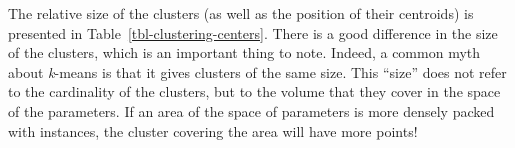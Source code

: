 \documentclass[
  letterpaper,
]{scrbook}
\begin{document}
{
\makeatletter
\def\LT@makecaption#1#2#3{%
  \noalign{\smash{\hbox{\kern\textwidth\rlap{\kern\marginparsep
  \parbox[t]{\marginparwidth}{%
    \footnotesize{%
      \vspace{(1.1\baselineskip)}
    #1{#2: }\ignorespaces #3}}}}}}%
    }
\makeatother

\begin{figure}[bt]



\end{figure}%

}


The relative size of the clusters (as well as the position of their
centroids) is presented in Table~\ref{tbl-clustering-centers}. There is
a good difference in the size of the clusters, which is an important
thing to note. Indeed, a common myth about \emph{k}-means is that it
gives clusters of the same size. This ``size'' does not refer to the
cardinality of the clusters, but to the volume that they cover in the
space of the parameters. If an area of the space of parameters is more
densely packed with instances, the cluster covering the area will have
more points!
\end{document}

